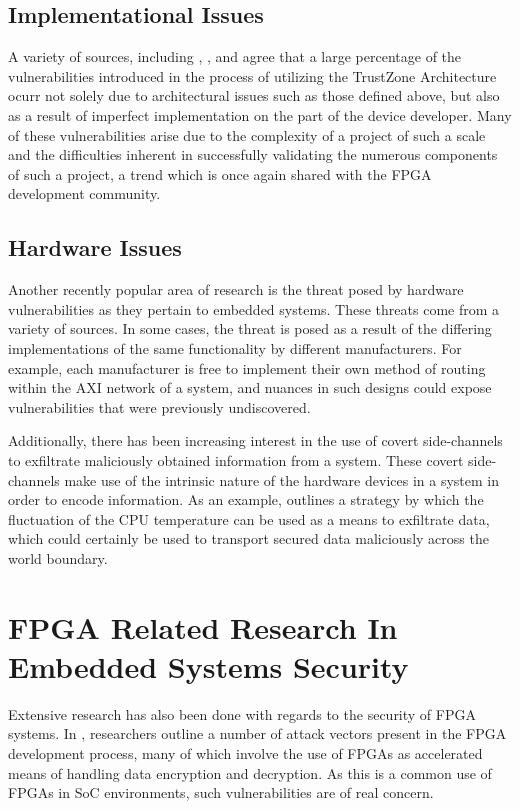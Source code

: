 \documentclass[journal]{IEEEtran}
\begin{document}
\subsection{Implementational Issues}
A variety of sources, including \cite{cerdeira_sok_nodate}, \cite{benhani_security_2019},
and \cite{benhani_security_2017} agree that a large percentage of the vulnerabilities
introduced in the process of utilizing the TrustZone Architecture ocurr not solely due to
architectural issues such as those defined above, but also as a result of imperfect
implementation on the part of the device developer. Many of these vulnerabilities arise
due to the complexity of a project of such a scale and the difficulties inherent in
successfully validating the numerous components of such a project, a trend which is once
again shared with the FPGA development community.

\subsection{Hardware Issues}
Another recently popular area of research is the threat posed by hardware vulnerabilities
as they pertain to embedded systems. These threats come from a variety of sources. In some
cases, the threat is posed as a result of the differing implementations of the same
functionality by different manufacturers. For example, each manufacturer is free to 
implement their own method of routing within the AXI network of a system, and nuances in
such designs could expose vulnerabilities that were previously undiscovered.

Additionally, there has been increasing interest in the use of covert side-channels to
exfiltrate maliciously obtained information from a system. These covert side-channels make
use of the intrinsic nature of the hardware devices in a system in order to encode
information. As an example, \cite{masti_thermal_2015} outlines a strategy by which the
fluctuation of the CPU temperature can be used as a means to exfiltrate data, which could
certainly be used to transport secured data maliciously across the world boundary.

\section{FPGA Related Research In Embedded Systems Security}
Extensive research has also been done with regards to the security of FPGA systems. In
\cite{badrignans_security_2011}, researchers outline a number of attack vectors present in
the FPGA development process, many of which involve the use of FPGAs as accelerated means
of handling data encryption and decryption. As this is a common use of FPGAs in SoC
environments, such vulnerabilities are of real concern. 
\end{document}

